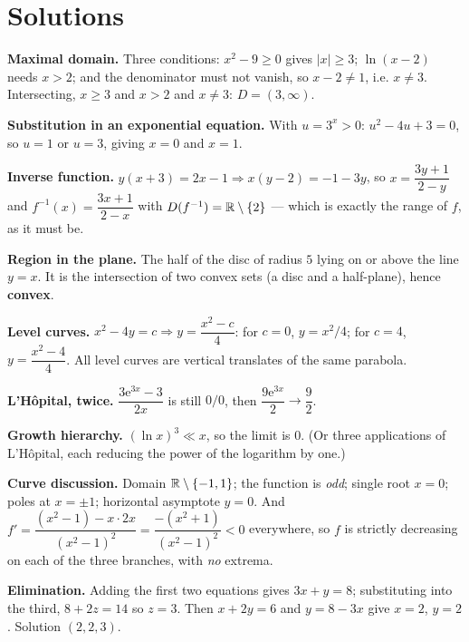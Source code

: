 \section{Solutions}

\begin{solutions}
  \item \textbf{Maximal domain.} Three conditions: $x^{2}-9\ge0$ gives
        $|x|\ge3$; $\ln(x-2)$ needs $x>2$; and the denominator must not
        vanish, so $x-2\neq1$, i.e. $x\neq3$. Intersecting,
        $x\ge3$ and $x>2$ and $x\neq3$: \;$D=(3,\infty)$.
  \item \textbf{Substitution in an exponential equation.} With
        $u=3^{x}>0$: $u^{2}-4u+3=0$, so $u=1$ or $u=3$, giving
        $x=0$ and $x=1$.
  \item \textbf{Inverse function.} $y(x+3)=2x-1\Rightarrow x(y-2)=-1-3y$,
        so $x=\dfrac{3y+1}{2-y}$ and
        $f^{-1}(x)=\dfrac{3x+1}{2-x}$ with
        $D(f^{-1})=\mathbb{R}\setminus\{2\}$ --- which is exactly the range of
        $f$, as it must be.
  \item \textbf{Region in the plane.} The half of the disc of radius $5$
        lying on or above the line $y=x$. It is the intersection of two
        convex sets (a disc and a half-plane), hence \textbf{convex}.
  \item \textbf{Level curves.} $x^{2}-4y=c\Rightarrow y=\dfrac{x^{2}-c}{4}$:
        for $c=0$, $y=x^{2}/4$; for $c=4$, $y=\dfrac{x^{2}-4}{4}$. All
        level curves are vertical translates of the same parabola.
  \item \textbf{L'H\^opital, twice.} $\dfrac{3\mathrm{e}^{3x}-3}{2x}$ is
        still $0/0$, then
        $\dfrac{9\mathrm{e}^{3x}}{2}\to\dfrac92$.
  \item \textbf{Growth hierarchy.} $(\ln x)^{3}\ll x$, so the limit is
        $0$. (Or three applications of L'H\^opital, each reducing the power
        of the logarithm by one.)
  \item \textbf{Curve discussion.} Domain $\mathbb{R}\setminus\{-1,1\}$; the
        function is \emph{odd}; single root $x=0$; poles at $x=\pm1$;
        horizontal asymptote $y=0$. And
        $f'=\dfrac{(x^{2}-1)-x\cdot2x}{(x^{2}-1)^{2}}
        =\dfrac{-(x^{2}+1)}{(x^{2}-1)^{2}}<0$ everywhere, so $f$ is
        strictly decreasing on each of the three branches, with \emph{no}
        extrema.
  \item \textbf{Elimination.} Adding the first two equations gives
        $3x+y=8$; substituting into the third, $8+2z=14$ so $z=3$. Then
        $x+2y=6$ and $y=8-3x$ give $x=2$, $y=2$. Solution $(2,2,3)$.

\end{solutions}
